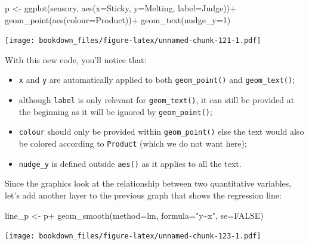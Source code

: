 \documentclass[
]{krantz}
\makeatletter
\newenvironment{Shaded}{\begin{snugshade}}{\end{snugshade}}
\newcommand{\AttributeTok}[1]{\textcolor[rgb]{0.61,0.61,0.61}{#1}}
\newcommand{\ConstantTok}[1]{\textcolor[rgb]{0,0,0}{#1}}
\newcommand{\DecValTok}[1]{\textcolor[rgb]{0.06,0.06,0.06}{#1}}
\newcommand{\FunctionTok}[1]{\textcolor[rgb]{0,0,0}{#1}}
\newcommand{\NormalTok}[1]{#1}
\newcommand{\OtherTok}[1]{\textcolor[rgb]{0.37,0.37,0.37}{#1}}
\newcommand{\SpecialCharTok}[1]{\textcolor[rgb]{0,0,0}{#1}}
\newcommand{\StringTok}[1]{\textcolor[rgb]{0.5,0.5,0.5}{#1}}
\providecommand{\tightlist}{%
  \setlength{\itemsep}{0pt}\setlength{\parskip}{0pt}}
\newenvironment{kframe}{%
\medskip{}
\setlength{\fboxsep}{.8em}
 \def\at@end@of@kframe{}%
 \ifinner\ifhmode%
  \def\at@end@of@kframe{\end{minipage}}%
  \begin{minipage}{\columnwidth}%
 \fi\fi%
 \def\FrameCommand##1{\hskip\@totalleftmargin \hskip-\fboxsep
 \colorbox{shadecolor}{##1}\hskip-\fboxsep
     \hskip-\linewidth \hskip-\@totalleftmargin \hskip\columnwidth}%
 \MakeFramed {\advance\hsize-\width
   \@totalleftmargin\z@ \linewidth\hsize
   \@setminipage}}%
 {\par\unskip\endMakeFramed%
 \at@end@of@kframe}
\renewenvironment{Shaded}{\begin{kframe}}{\end{kframe}}
\makeatother
\begin{document}
\begin{Shaded}
\begin{Highlighting}[]
\NormalTok{p }\OtherTok{\textless{}{-}} \FunctionTok{ggplot}\NormalTok{(sensory, }\FunctionTok{aes}\NormalTok{(}\AttributeTok{x=}\NormalTok{Sticky, }\AttributeTok{y=}\NormalTok{Melting, }\AttributeTok{label=}\NormalTok{Judge))}\SpecialCharTok{+}
  \FunctionTok{geom\_point}\NormalTok{(}\FunctionTok{aes}\NormalTok{(}\AttributeTok{colour=}\NormalTok{Product))}\SpecialCharTok{+}
  \FunctionTok{geom\_text}\NormalTok{(}\AttributeTok{nudge\_y=}\DecValTok{1}\NormalTok{)}
\end{Highlighting}
\end{Shaded}

\texttt{[image: bookdown\_files/figure-latex/unnamed-chunk-121-1.pdf]}

With this new code, you'll notice that:

\begin{itemize}
\tightlist
\item
  \texttt{x} and \texttt{y} are automatically applied to both \texttt{geom\_point()} and \texttt{geom\_text()};
\item
  although \texttt{label} is only relevant for \texttt{geom\_text()}, it can still be provided at the beginning as it will be ignored by \texttt{geom\_point()};
\item
  \texttt{colour} should only be provided within \texttt{geom\_point()} else the text would also be colored according to \texttt{Product} (which we do not want here);
\item
  \texttt{nudge\_y} is defined outside \texttt{aes()} as it applies to all the text.
\end{itemize}

Since the graphics look at the relationship between two quantitative variables, let's add another layer to the previous graph that shows the regression line:

\begin{Shaded}
\begin{Highlighting}[]
\NormalTok{line\_p }\OtherTok{\textless{}{-}}\NormalTok{ p}\SpecialCharTok{+}
  \FunctionTok{geom\_smooth}\NormalTok{(}\AttributeTok{method=}\NormalTok{lm, }\AttributeTok{formula=}\StringTok{"y\textasciitilde{}x"}\NormalTok{, }\AttributeTok{se=}\ConstantTok{FALSE}\NormalTok{)}
\end{Highlighting}
\end{Shaded}

\texttt{[image: bookdown\_files/figure-latex/unnamed-chunk-123-1.pdf]}
\end{document}
